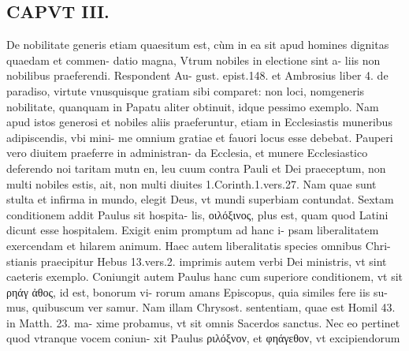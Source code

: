 \documentclass{article}
\begin{document}
\begin{pages}
\section*{CAPVT  III. }
\marginpar{[ p.125 ]}\pstart De nobilitate generis etiam quaesitum est, cùm in ea sit apud homines dignitas quaedam et commen- datio magna, Vtrum nobiles in electione sint a- liis non nobilibus praeferendi. Respondent Au- gust. epist.148. et Ambrosius liber 4. de paradiso, virtute vnusquisque gratiam sibi comparet: non loci, nomgeneris nobilitate, quanquam in Papatu aliter obtinuit, idque  pessimo exemplo. Nam apud istos generosi et nobiles aliis praeferuntur, etiam in Ecclesiastis muneribus adipiscendis, vbi mini- me omnium gratiae et fauori locus esse debebat.  \pend\pstart Pauperi vero diuitem praeferre in administran- da Ecclesia, et munere Ecclesiastico deferendo noi taritam mutn en, leu cuum contra Pauli et Dei praeceptum, non multi nobiles estis, ait, non multi diuites 1.Corinth.1.vers.27. Nam quae sunt stulta et infirma in mundo, elegit Deus, vt mundi superbiam contundat.  \pend\pstart Sextam conditionem addit Paulus sit hospita- lis, οιλόξινος, plus est, quam quod Latini dicunt esse hospitalem. Exigit enim promptum ad hanc i- psam liberalitatem exercendam et hilarem animum. Haec autem liberalitatis species omnibus Chri- stianis praecipitur Hebus 13.vers.2. imprimis autem verbi Dei ministris, vt sint caeteris exemplo. Coniungit autem Paulus hanc cum superiore conditionem, vt sit ρηάγ ἀθος, id est, bonorum vi- rorum amans Episcopus, quia similes fere iis su- mus, quibuscum ver samur. Nam illam Chrysost. sententiam, quae est Homil 43. in Matth. 23. ma- xime probamus, vt sit omnis Sacerdos sanctus. Nec eo pertinet quod vtranque vocem coniun- xit Paulus ριλόξνον, et φηάγεθον, vt excipiendorum  \pend

\end{pages}
\end{document}

